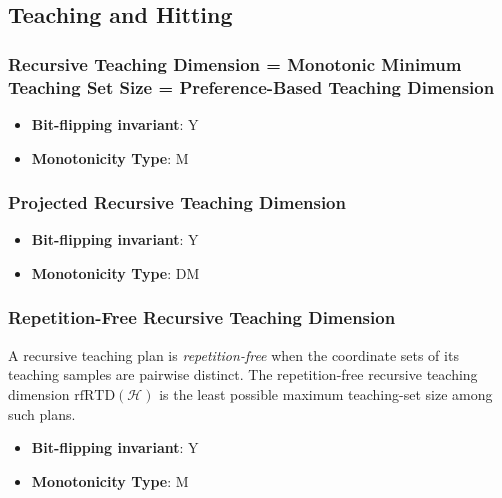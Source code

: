\subsection{Teaching and Hitting}\label{sec:Teaching and Hitting}
\subsubsection{Recursive Teaching Dimension = Monotonic Minimum Teaching Set Size = Preference-Based Teaching Dimension}
      
      \begin{definition}[Recursive Teaching Dimension = Monotonic Minimum Teaching Set Size = Preference-Based Teaching Dimension - {\begin{tabular}{l}$\mathrm{RTD} = \mathrm{TS}_{\min}^* = \mathrm{PBTD}$\end{tabular}}]\label{def:recursive_teaching_dimension_=_monotonic_minimum_teaching_set_size_=_preference-based_teaching_dimension}
      
      \end{definition}
      \begin{itemize}
      \item {\bf Bit-flipping invariant}: Y
      \item {\bf Monotonicity Type}: M
      \end{itemize}
\subsubsection{Projected Recursive Teaching Dimension}
      
      \begin{definition}\label{def:monotone_recursive_teaching_dimension}
      
      \end{definition}
      \begin{itemize}
      \item {\bf Bit-flipping invariant}: Y
      \item {\bf Monotonicity Type}: DM
      \end{itemize}
\subsubsection{Repetition-Free Recursive Teaching Dimension}
      
      \begin{definition}\label{def:repetitionfree_recursive_teaching_dimension}
      A recursive teaching plan is \emph{repetition-free} when the coordinate
      sets of its teaching samples are pairwise distinct.  The repetition-free
      recursive teaching dimension $\mathrm{rfRTD}(\mathcal H)$ is the least
      possible maximum teaching-set size among such plans.
      \end{definition}
      \begin{itemize}
      \item {\bf Bit-flipping invariant}: Y
      \item {\bf Monotonicity Type}: M
      \end{itemize}
